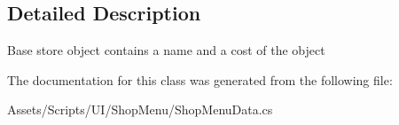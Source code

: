 \subsection{Detailed Description}
Base store object contains a name and a cost of the object 



The documentation for this class was generated from the following file\+:\begin{DoxyCompactItemize}
\item 
Assets/\+Scripts/\+U\+I/\+Shop\+Menu/Shop\+Menu\+Data.\+cs\end{DoxyCompactItemize}
